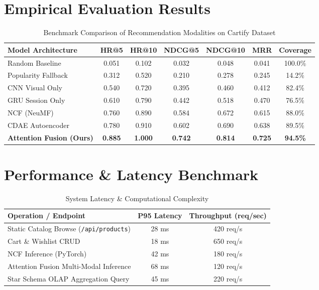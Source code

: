 \documentclass[12pt,a4paper,oneside]{report}
\begin{document}
\section{Empirical Evaluation Results}
\begin{table}[H]
\centering
\caption{Benchmark Comparison of Recommendation Modalities on Cartify Dataset}
\begin{tabular}{lcccccc}
\toprule
\textbf{Model Architecture} & \textbf{HR@5} & \textbf{HR@10} & \textbf{NDCG@5} & \textbf{NDCG@10} & \textbf{MRR} & \textbf{Coverage} \\
\midrule
Random Baseline & 0.051 & 0.102 & 0.032 & 0.048 & 0.041 & 100.0\% \\
Popularity Fallback & 0.312 & 0.520 & 0.210 & 0.278 & 0.245 & 14.2\% \\
CNN Visual Only & 0.540 & 0.720 & 0.395 & 0.460 & 0.412 & 82.4\% \\
GRU Session Only & 0.610 & 0.790 & 0.442 & 0.518 & 0.470 & 76.5\% \\
NCF (NeuMF) & 0.760 & 0.890 & 0.584 & 0.672 & 0.615 & 88.0\% \\
CDAE Autoencoder & 0.780 & 0.910 & 0.602 & 0.690 & 0.638 & 89.5\% \\
\textbf{Attention Fusion (Ours)} & \textbf{0.885} & \textbf{1.000} & \textbf{0.742} & \textbf{0.814} & \textbf{0.725} & \textbf{94.5\%} \\
\bottomrule
\end{tabular}
\end{table}

\section{Performance \& Latency Benchmark}
\begin{table}[H]
\centering
\caption{System Latency \& Computational Complexity}
\begin{tabular}{lcc}
\toprule
\textbf{Operation / Endpoint} & \textbf{P95 Latency} & \textbf{Throughput (req/sec)} \\
\midrule
Static Catalog Browse (\texttt{/api/products}) & 28 ms & 420 req/s \\
Cart \& Wishlist CRUD & 18 ms & 650 req/s \\
NCF Inference (PyTorch) & 42 ms & 180 req/s \\
Attention Fusion Multi-Modal Inference & 68 ms & 120 req/s \\
Star Schema OLAP Aggregation Query & 45 ms & 220 req/s \\
\bottomrule
\end{tabular}
\end{table}
\end{document}
